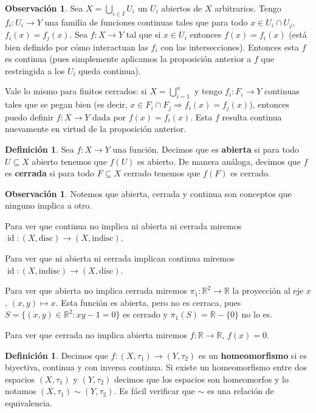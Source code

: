 \documentclass[12pt]{book}
\theoremstyle{definition}
\newtheorem{obs}[teo]{Observación}
\newtheorem{defn}[teo]{Definición}
\newcommand{\RR}{\mathbb{R}}      %
\DeclareMathOperator{\id}{id}
\begin{document}
\begin{obs}
Sea $X=\displaystyle\bigcup_{i\in I}U_i$ un $U_i$ abiertos de $X$ arbitrarios. Tengo $f_i:U_i\to Y$ una familia de funciones continuas tales que para todo $x\in U_i\cap U_j$, $f_i(x)=f_j(x)$. Sea $f:X\to Y$ tal que si $x\in U_i$ entonces $f(x) = f_i(x)$ (está bien definido por cómo interactuan las $f_i$ con las intersecciones). Entonces esta $f$ es continua (pues simplemente aplicamos la proposición anterior a $f$ que restringida a los $U_i$ queda continua).

Vale lo mismo para finitos cerrados: si $X=\displaystyle\bigcup_{i=1}^n$ y tengo $f_i:F_i\to Y$ continuas tales que se pegan bien (es decir, $x\in F_i\cap F_j \Longrightarrow f_i(x)=f_j(x)$), entonces puedo definir $f:X\to Y$ dada por $f(x) = f_i(x)$. Esta $f$ resulta continua nuevamente en virtud de la proposición anterior.
\end{obs}

\begin{defn}
Sea $f:X\to Y$ una función. Decimos que es \textbf{abierta} si para todo $U\subseteq X$ abierto tenemos que $f(U)$ es abierto. De manera análoga, decimos que $f$ es \textbf{cerrada} si para todo $F\subseteq X$ cerrado tenemos que $f(F)$ es cerrado.
\end{defn}

\begin{obs}
Notemos que abierta, cerrada y continua son conceptos que ninguno implica a otro.

Para ver que continua no implica ni abierta ni cerrada miremos $\id:(X,\mathrm{disc})\to (X,\mathrm{indisc})$.

Para ver que ni abierta ni cerrada implican continua miremos $\id:(X,\mathrm{indisc})\to (X,\mathrm{disc})$.

Para ver que abierta no implica cerrada miremos $\pi_1:\RR^2\to \RR$ la proyección al eje $x$, $(x,y)\mapsto x$. Esta función es abierta, pero no es cerraca, pues $S=\{(x,y)\in\RR^2 : xy-1 = 0\}$ es cerrado y $\pi_1(S)=\RR-\{0\}$ no lo es.

Para ver que cerrada no implica abierta miremos $f:\RR\to\RR$, $f(x)=0$.
\end{obs}

\begin{defn}
Decimos que $f:(X,\tau_1)\to (Y,\tau_2)$ es un \textbf{homeomorfismo} si es biyectiva, continua y con inversa continua. Si existe un homeomorfismo entre dos espacios $(X,\tau_1)$ y $(Y,\tau_2)$ decimos que los espacios son homeomorfos y lo notamos $(X,\tau_1)\sim (Y,\tau_2)$. Es fácil verificar que $\sim$ es una relación de equivalencia.
\end{defn}
\end{document}
